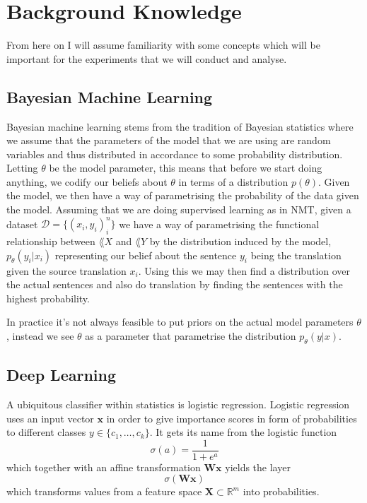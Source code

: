 \chapter{Background Knowledge}
\label{BackgroundKnowledgeCh}

From here on I will assume familiarity with some concepts which will be
important for the experiments that we will conduct and analyse.

\section{Bayesian Machine Learning}
Bayesian machine learning stems from the tradition of Bayesian statistics where
we assume that the parameters of the model that we are using are random
variables and thus distributed in accordance to some probability distribution.
Letting $\theta$ be the model parameter, this means that before we start doing
anything, we codify our beliefs about $\theta$ in terms of a distribution
$p(\theta)$. Given the model, we then have a way of parametrising the
probability of the data given the model. Assuming that we are doing supervised
learning as in NMT, given a dataset $ \mathcal{D} = \{(x_i, y_i)_i^n\}$ we have a way of
parametrising the functional relationship between $\lang{X}$ and $\lang{Y}$ by
the distribution induced by the model, $p_{\theta}(y_i | x_i)$ representing our
belief about the sentence $y_i$ being the translation given the source
translation $x_i$. Using this we may then find a distribution over the actual
sentences and also do translation by finding the sentences with the highest
probability.

In practice it's not always feasible to put priors on the actual model
parameters $\theta$, instead we see $\theta$ as a parameter that parametrise the
distribution $p_{\theta}(y | x)$.

\section{Deep Learning}
A ubiquitous classifier within statistics is logistic regression. Logistic
regression uses an input vector $\bm{x}$ in order to give importance scores in
form of probabilities to different classes $y \in \{c_1, \dots, c_k\}$. It gets
its name from the logistic function
\begin{equation}
  \label{eq:logistic_function}
  \sigma(a) = \frac{1}{1 + e^{a}}
\end{equation}
which together with an affine transformation $\bm{W} \bm{x}$ yields the layer
\begin{equation*}
  \sigma(\bm{W} \bm{x})
\end{equation*}
which transforms values from a feature space $\bm{X} \subset \mathbb{R}^m$ into
probabilities\cite{Bishop:2006}.

